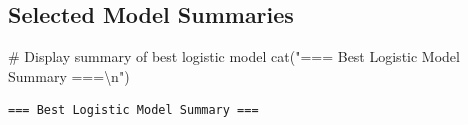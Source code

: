 \documentclass[
  11pt]{article}
\newenvironment{Shaded}{\begin{snugshade}}{\end{snugshade}}
\newcommand{\CommentTok}[1]{\textcolor[rgb]{0.37,0.37,0.37}{#1}}
\newcommand{\FunctionTok}[1]{\textcolor[rgb]{0.28,0.35,0.67}{#1}}
\newcommand{\NormalTok}[1]{\textcolor[rgb]{0.00,0.23,0.31}{#1}}
\newcommand{\SpecialCharTok}[1]{\textcolor[rgb]{0.37,0.37,0.37}{#1}}
\newcommand{\StringTok}[1]{\textcolor[rgb]{0.13,0.47,0.30}{#1}}
\begin{document}
\subsection{Selected Model Summaries}\label{selected-model-summaries}

\begin{Shaded}
\begin{Highlighting}[]
\CommentTok{\# Display summary of best logistic model}
\FunctionTok{cat}\NormalTok{(}\StringTok{"=== Best Logistic Model Summary ===}\SpecialCharTok{\textbackslash{}n}\StringTok{"}\NormalTok{)}
\end{Highlighting}
\end{Shaded}

\begin{verbatim}
=== Best Logistic Model Summary ===
\end{verbatim}

\begin{Shaded}
\end{Shaded}
\end{document}
